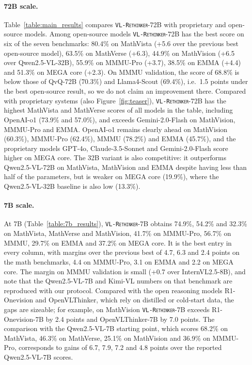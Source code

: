 \documentclass{article}
\newcommand{\model}{\texttt{\textsc{VL-Rethinker}}\xspace}
\begin{document}
\paragraph{72B scale.} Table~\ref{table:main_results} compares \model-72B with proprietary and open-source models. Among open-source models \model-72B has the best score on six of the seven benchmarks: 80.4\% on MathVista (+5.6 over the previous best open-source model), 63.5\% on MathVerse (+6.3), 44.9\% on MathVision (+6.5 over Qwen2.5-VL-32B), 55.9\% on MMMU-Pro (+3.7), 38.5\% on EMMA (+4.4) and 51.3\% on MEGA core (+2.3). On MMMU validation, the score of 68.8\% is below those of QvQ-72B (70.3\%) and Llama4-Scout (69.4\%), i.e.\ 1.5 points under the best open-source result, so we do not claim an improvement there. Compared with proprietary systems (also Figure~\ref{fig:teaser}), \model-72B has the highest MathVista and MathVerse scores of all models in the table, including OpenAI-o1 (73.9\% and 57.0\%), and exceeds Gemini-2.0-Flash on MathVision, MMMU-Pro and EMMA. OpenAI-o1 remains clearly ahead on MathVision (60.3\%), MMMU-Pro (62.4\%), MMMU (78.2\%) and EMMA (45.7\%), and the proprietary models GPT-4o, Claude-3.5-Sonnet and Gemini-2.0-Flash score higher on MEGA core. The 32B variant is also competitive: it outperforms Qwen2.5-VL-72B on MathVista, MathVision and EMMA despite having less than half of the parameters, but is weaker on MEGA core (19.9\%), where the Qwen2.5-VL-32B baseline is also low (13.3\%).

\paragraph{7B scale.} At 7B (Table~\ref{table:7b_results}), \model-7B obtains 74.9\%, 54.2\% and 32.3\% on MathVista, MathVerse and MathVision, 41.7\% on MMMU-Pro, 56.7\% on MMMU, 29.7\% on EMMA and 37.2\% on MEGA core. It is the best entry in every column, with margins over the previous best of 4.7, 6.3 and 2.4 points on the math benchmarks, 4.4 on MMMU-Pro, 3.1 on EMMA and 2.2 on MEGA core. The margin on MMMU validation is small (+0.7 over InternVL2.5-8B), and note that the Qwen2.5-VL-7B and Kimi-VL numbers on that benchmark are reproduced with our protocol. Compared with the open reasoning models R1-Onevision and OpenVLThinker, which rely on distilled or cold-start data, the gaps are sizeable; for example, on MathVision \model-7B exceeds R1-Onevision-7B by 2.4 points and OpenVLThinker-7B by 7.0 points. The comparison with the Qwen2.5-VL-7B starting point, which scores 68.2\% on MathVista, 46.3\% on MathVerse, 25.1\% on MathVision and 36.9\% on MMMU-Pro, corresponds to gains of 6.7, 7.9, 7.2 and 4.8 points over the reported Qwen2.5-VL-7B scores.
\end{document}
